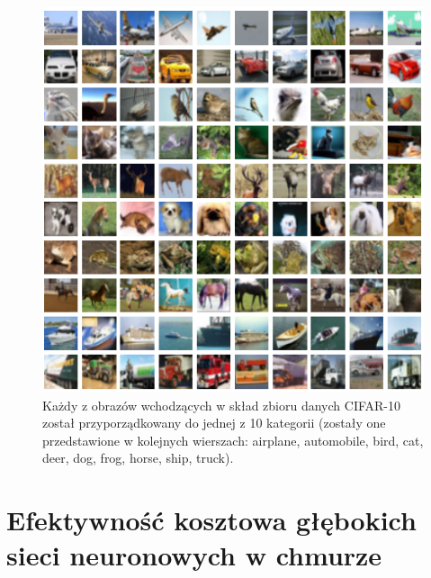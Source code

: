 \documentclass[12pt,a4paper,twoside]{article}
\begin{document}
\begin{figure}[h]
  \centering
\includegraphics[scale=0.9]{../obrazy/fig:cifar_data.png}
\caption{Każdy z obrazów wchodzących w skład zbioru danych CIFAR-10 został przyporządkowany do jednej z 10 kategorii (zostały one przedstawione w kolejnych wierszach: airplane, automobile, bird, cat, deer, dog, frog, horse, ship, truck). \label{fig:cifar_data}}
\end{figure}





\clearpage

\section{Efektywność kosztowa głębokich sieci neuronowych w chmurze}
\end{document}
